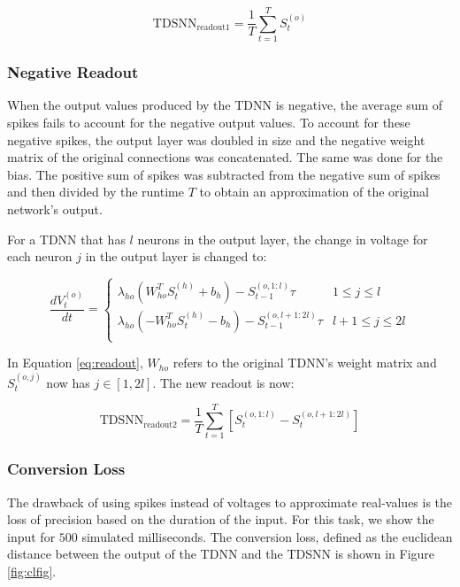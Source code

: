 \documentclass{article}
\begin{document}
\begin{equation}
    \text{TDSNN}_{\text{readout1}} = \frac{1}{T} \sum_{t=1}^{T}{S_t^{\left(o\right)}}
\end{equation}

\subsubsection*{Negative Readout}
When the output values produced by the TDNN is negative, the average sum of spikes fails to account for the negative output values. To account for these negative spikes, the output layer was doubled in size and the negative weight matrix of the original connections was concatenated. The same was done for the bias. The positive sum of spikes was subtracted from the negative sum of spikes and then divided by the runtime $T$ to obtain an approximation of the original network's output.

For a TDNN that has $l$ neurons in the output layer, the change in voltage for each neuron $j$ in the output layer is changed to:

\begin{equation}
    \frac{dV^{\left(o\right)}_t}{dt} = 
    \begin{cases} \lambda_{ho} \left(W_{ho}^TS^{\left(h\right)}_{t} + b_h\right) - S^{\left(o,1:l\right)}_{t-1} \tau & 1 \leq j \leq l  \\
      \lambda_{ho} \left(-W_{ho}^TS^{\left(h\right)}_{t} - b_h\right) - S^{\left(o,l+1:2l\right)}_{t-1} \tau & l+1 \leq j \leq 2l \\ \end{cases}
    \label{eq:readout}
\end{equation}

In Equation \ref{eq:readout}, $W_{ho}$ refers to the original TDNN's weight matrix and $S^{\left(o,j\right)}_{t}$ now has $j \in [1, 2l]$. The new readout is now:

\begin{equation}
    \text{TDSNN}_{\text{readout2}} = \frac{1}{T} \sum_{t=1}^{T}{\left[S_t^{\left(o,1:l\right)} - S_t^{\left(o,l+1:2l\right)}\right]}
\end{equation}

\subsubsection*{Conversion Loss}
The drawback of using spikes instead of voltages to approximate real-values is the loss of precision based on the duration of the input. For this task, we show the input for $500$ simulated milliseconds. The conversion loss, defined as the euclidean distance between the output of the TDNN and the TDSNN is shown in Figure \ref{fig:clfig}.
\end{document}

